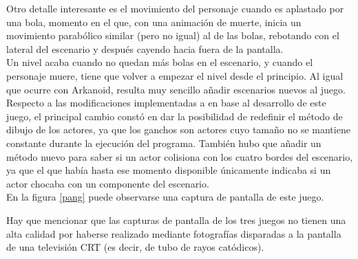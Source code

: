 Otro detalle interesante es el movimiento del personaje cuando es aplastado por una bola, momento en el que, con una animación de muerte, inicia un movimiento parabólico similar (pero no igual) al de las bolas, rebotando con el lateral del escenario y después cayendo hacia fuera de la pantalla.\\

Un nivel acaba cuando no quedan más bolas en el escenario, y cuando el personaje muere, tiene que volver a empezar el nivel desde el principio. Al igual que ocurre con Arkanoid, resulta muy sencillo añadir escenarios nuevos al juego.\\

Respecto a las modificaciones implementadas a  en base al desarrollo de este juego, el principal cambio constó en dar la posibilidad de redefinir el método de dibujo de los actores, ya que los ganchos son actores cuyo tamaño no se mantiene constante durante la ejecución del programa. También hubo que añadir un método nuevo para saber si un actor colisiona con los cuatro bordes del escenario, ya que el que había hasta ese momento disponible únicamente indicaba si un actor chocaba con un componente del escenario.\\

En la figura \ref{pang} puede observarse una captura de pantalla de este juego.\\


Hay que mencionar que las capturas de pantalla de los tres juegos no tienen una alta calidad por haberse realizado mediante fotografías disparadas a la pantalla de una televisión CRT (es decir, de tubo de rayos catódicos).

